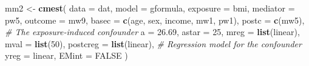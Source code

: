 \documentclass[
]{book}
\newenvironment{Shaded}{\begin{snugshade}}{\end{snugshade}}
\newcommand{\AttributeTok}[1]{\textcolor[rgb]{0.13,0.29,0.53}{#1}}
\newcommand{\CommentTok}[1]{\textcolor[rgb]{0.56,0.35,0.01}{\textit{#1}}}
\newcommand{\ConstantTok}[1]{\textcolor[rgb]{0.56,0.35,0.01}{#1}}
\newcommand{\DecValTok}[1]{\textcolor[rgb]{0.00,0.00,0.81}{#1}}
\newcommand{\FloatTok}[1]{\textcolor[rgb]{0.00,0.00,0.81}{#1}}
\newcommand{\FunctionTok}[1]{\textcolor[rgb]{0.13,0.29,0.53}{\textbf{#1}}}
\newcommand{\NormalTok}[1]{#1}
\newcommand{\OtherTok}[1]{\textcolor[rgb]{0.56,0.35,0.01}{#1}}
\newcommand{\StringTok}[1]{\textcolor[rgb]{0.31,0.60,0.02}{#1}}
\begin{document}
\begin{Shaded}
\begin{Highlighting}[]
\NormalTok{mm2 }\OtherTok{\textless{}{-}} \FunctionTok{cmest}\NormalTok{(}
  \AttributeTok{data =}\NormalTok{ dat, }
  \AttributeTok{model =} \StringTok{\textquotesingle{}gformula\textquotesingle{}}\NormalTok{, }
  \AttributeTok{exposure =} \StringTok{\textquotesingle{}bmi\textquotesingle{}}\NormalTok{, }
  \AttributeTok{mediator =} \StringTok{\textquotesingle{}pw5\textquotesingle{}}\NormalTok{, }
  \AttributeTok{outcome =} \StringTok{\textquotesingle{}mw9\textquotesingle{}}\NormalTok{, }
  \AttributeTok{basec =} \FunctionTok{c}\NormalTok{(}\StringTok{\textquotesingle{}age\textquotesingle{}}\NormalTok{, }\StringTok{\textquotesingle{}sex\textquotesingle{}}\NormalTok{, }\StringTok{\textquotesingle{}income\textquotesingle{}}\NormalTok{, }\StringTok{\textquotesingle{}mw1\textquotesingle{}}\NormalTok{, }\StringTok{\textquotesingle{}pw1\textquotesingle{}}\NormalTok{), }
  \AttributeTok{postc =} \FunctionTok{c}\NormalTok{(}\StringTok{\textquotesingle{}mw5\textquotesingle{}}\NormalTok{),       }\CommentTok{\# The exposure{-}induced confounder}
  \AttributeTok{a =} \FloatTok{26.69}\NormalTok{, }
  \AttributeTok{astar =} \DecValTok{25}\NormalTok{, }
  \AttributeTok{mreg =} \FunctionTok{list}\NormalTok{(}\StringTok{\textquotesingle{}linear\textquotesingle{}}\NormalTok{), }
  \AttributeTok{mval =} \FunctionTok{list}\NormalTok{(}\DecValTok{50}\NormalTok{), }
  \AttributeTok{postcreg =} \FunctionTok{list}\NormalTok{(}\StringTok{\textquotesingle{}linear\textquotesingle{}}\NormalTok{), }\CommentTok{\# Regression model for the confounder}
  \AttributeTok{yreg =} \StringTok{\textquotesingle{}linear\textquotesingle{}}\NormalTok{, }
  \AttributeTok{EMint =} \ConstantTok{FALSE}
\NormalTok{) }
\end{Highlighting}
\end{Shaded}
\end{document}
